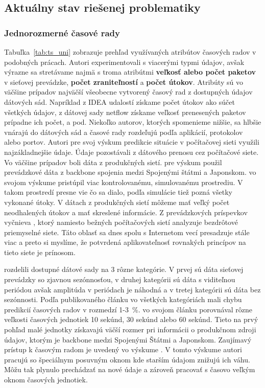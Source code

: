 \documentclass[thesismargins, thesislinespacing, openright, upjsfrontpage, combineabstracts]{rnthesis}
\begin{document}
\subsection{Aktuálny stav riešenej problematiky}

\subsubsection{Jednorozmerné časové rady}

Tabuľka~\ref{tab:ts_uni} zobrazuje prehľad využívaných atribútov časových radov v podobných prácach. Autori experimentovali s viacerými typmi údajov, avšak výrazne sa stretávame najmä s troma atribútmi \textbf{veľkosť alebo počet paketov} v sieťovej prevádzke, \textbf{počet zraniteľností} a \textbf{počet útokov}. Atribúty sú vo väčšine prípadov najväčší všeobecne vytvorený časový rad z dostupných údajov dátových sád. Napríklad z IDEA udalostí získame počet útokov ako súčet všetkých údajov, z dátovej sady netflow získame veľkosť prenesených paketov prípadne ich počet, a pod. Niekoľko autorov, ktorých spomenieme nižšie, sa hlbšie vnárajú do dátových sád a časové rady rozdeľujú podľa aplikácií, protokolov alebo portov. 
Autori \cite{jiang2004detecting, wei2012intrusion,madan2018predicting, sang2002predictability,wang2008internet,hasegawa2001applications} pre svoj výskum predikcie situácie v počítačovej sieti využili najzákladnejšie údaje. Údaje pozostávali z dátového prenosu cez počítačové siete. Vo väčšine prípadov boli dáta z produkčných sietí. \cite{hasegawa2001applications} pre výskum použil prevádzkové dáta z backbone spojenia medzi Spojenými štátmi a Japonskom. \cite{jiang2004detecting} vo svojom výskume pristúpil viac kontrolovanému, simulovanému prostrediu. V takom prostredí presne vie čo sa dialo, podľa simulácie tiež pozná všetky vykonané útoky. V dátach z produkčných sietí môžeme mať veľký počet neodhalených útokov a mať skreslené informácie. Z prevádzkových príspevkov vyčnieva \cite{wei2012intrusion}, ktorý namiesto bežných počítačových sietí analyzuje bezdrôtové priemyselné siete. Táto oblasť sa dnes spolu s Internetom vecí presadzuje stále viac a preto si myslíme, že potvrdená aplikovateľnosť rovnakých princípov na tieto siete je prínosom.

\cite{cortez2012multi} rozdelili dostupné dátové sady na 3 rôzne kategórie. V prvej sú dáta sieťovej prevádzky so zjavnou sezónnosťou, v druhej kategórii sú dáta s viditeľnou periódou avšak amplitúda v periódach je náhodná a v tretej kategórii sú dáta bez sezónnosti. Podľa publikovaného článku vo všetkých kategóriách mali chybu predikcií časových radov v rozmedzí 1-3~\%. \cite{hasegawa2001applications} vo svojom článku porovnával rôzne veľkosti časových jednotiek 10 sekúnd, 30 sekúnd alebo 60 sekúnd. Tieto na prvý pohľad malé jednotky získavajú väčší rozmer pri informácii o produkčnom zdroji údajov, ktorým je backbone medzi Spojenými Štátmi a Japonskom. Zaujímavý prístup k časovým radom je uvedený vo výskume \cite{papagiannaki2005long}. V tomto výskume autori pracujú so špeciálnym posuvným oknom kde starším údajom znižujú ich váhu. Môžu tak plynulo prechádzať na nové údaje a zároveň pracovať s časovo veľkým oknom časových jednotiek.
\end{document}
